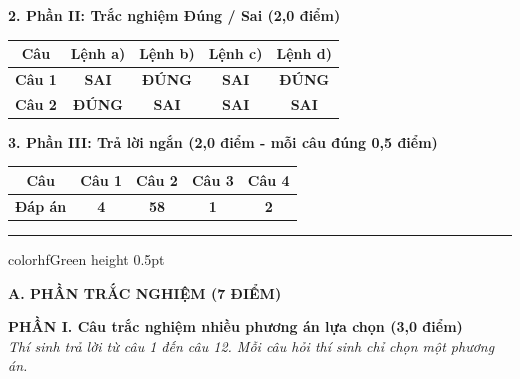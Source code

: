 \documentclass[11pt,a4paper]{article}
\begin{document}
\vspace{2pt}
\noindent
\textbf{\color{mainGreen}2. Phần II: Trắc nghiệm Đúng / Sai (2,0 điểm)}
\begin{center}
\renewcommand{\arraystretch}{1.2}
\begin{tabular}{|c|c|c|c|c|}
\hline
\rowcolor{tableGreen}
\textbf{Câu} & \textbf{Lệnh a)} & \textbf{Lệnh b)} & \textbf{Lệnh c)} & \textbf{Lệnh d)} \\
\hline
\textbf{Câu 1} & \textbf{\color{solBlue}SAI} & \textbf{\color{hfRed}ĐÚNG} & \textbf{\color{solBlue}SAI} & \textbf{\color{hfRed}ĐÚNG} \\
\hline
\textbf{Câu 2} & \textbf{\color{hfRed}ĐÚNG} & \textbf{\color{solBlue}SAI} & \textbf{\color{solBlue}SAI} & \textbf{\color{solBlue}SAI} \\
\hline
\end{tabular}
\end{center}

\vspace{2pt}
\noindent
\textbf{\color{mainGreen}3. Phần III: Trả lời ngắn (2,0 điểm - mỗi câu đúng 0,5 điểm)}
\begin{center}
\renewcommand{\arraystretch}{1.2}
\begin{tabular}{|c|c|c|c|c|}
\hline
\rowcolor{tableGreen}
\textbf{Câu} & \textbf{Câu 1} & \textbf{Câu 2} & \textbf{Câu 3} & \textbf{Câu 4} \\
\hline
\textbf{Đáp án} & \textbf{\color{hfRed}4} & \textbf{\color{hfRed}58} & \textbf{\color{hfRed}1} & \textbf{\color{hfRed}2} \\
\hline
\end{tabular}
\end{center}

\vspace{4pt}
\hrule color{hfGreen} height 0.5pt

\vspace{4pt}
\noindent
{\color{mainGreen}\textbf{\Large A. PHẦN TRẮC NGHIỆM (7 ĐIỂM)}}

\vspace{3pt}
\noindent
{\color{mainGreen}\textbf{\large PHẦN I. Câu trắc nghiệm nhiều phương án lựa chọn (3,0 điểm)}}\\
\textit{\small Thí sinh trả lời từ câu 1 đến câu 12. Mỗi câu hỏi thí sinh chỉ chọn một phương án.}
\vspace{2pt}
\end{document}
